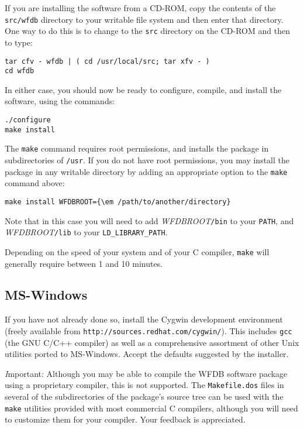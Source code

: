 \documentclass[twoside]{article}
\begin{document}
If you are installing the software from a CD-ROM, copy the contents of the
{\tt src/wfdb} directory to your writable file system and then enter that
directory.  One way to do this is to change to the {\tt src} directory on the
CD-ROM and then to type:

\begin{verbatim}
tar cfv - wfdb | ( cd /usr/local/src; tar xfv - )
cd wfdb
\end{verbatim}

In either case, you should now be ready to configure, compile, and install
the software, using the commands:

\begin{verbatim}
./configure
make install
\end{verbatim}

The {\tt make} command requires root permissions, and installs the package
in subdirectories of {\tt /usr}.  If you do not have root permissions,
you may install the package in any writable directory by adding an
appropriate option to the {\tt make} command above:

\begin{verbatim}
make install WFDBROOT={\em /path/to/another/directory}
\end{verbatim}

Note that in this case you will need to add {\em WFDBROOT}{\tt /bin}
to your {\tt PATH}, and {\em WFDBROOT}{\tt /lib} to your
{\tt LD\_LIBRARY\_PATH}.

Depending on the speed of your system and of your C compiler, {\tt make} will
generally require between 1 and 10 minutes.

\subsection*{MS-Windows}

If you have not already done so, install the Cygwin development environment
(freely available from {\tt http://sources.redhat.com/cygwin/}).  This includes
{\tt gcc} (the GNU C/C++ compiler) as well as a comprehensive assortment of
other Unix utilities ported to MS-Windows.  Accept the defaults suggested by
the installer.

{\emph Important:} Although you may be able to compile the WFDB software
package using a proprietary compiler, this is {\emph not supported}.  The
{\tt Makefile.dos} files in several of the subdirectories of the package's
source tree can be used with the {\tt make} utilities provided with most
commercial C compilers, although you will need to customize them for your
compiler. Your feedback is appreciated.
\end{document}
